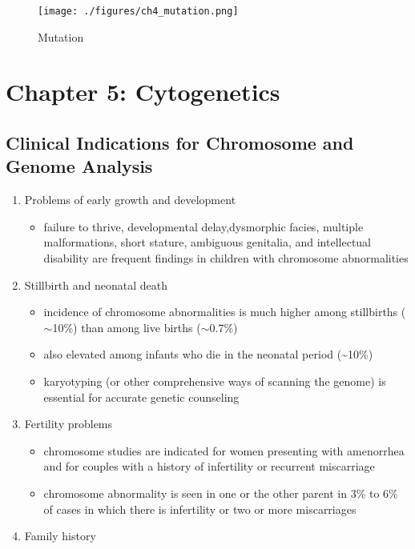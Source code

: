 \documentclass{scrartcl}
\begin{document}
\begin{figure}[htbp]
\centering
\texttt{[image: ./figures/ch4\_mutation.png]}
\caption{\label{fig:org35d6c0f}
Mutation}
\end{figure}

\section{Chapter 5: Cytogenetics}
\label{sec:org348f328}
\subsection{Clinical Indications for Chromosome and Genome Analysis}
\label{sec:org6d50cd8}
\begin{enumerate}
\item Problems of early growth and development
\label{sec:org7985ddf}
\begin{itemize}
\item failure to thrive, developmental delay,dysmorphic facies, multiple
malformations, short stature, ambiguous genitalia, and
intellectual disability are frequent findings in children with
chromosome abnormalities
\end{itemize}
\item Stillbirth and neonatal death
\label{sec:org608cdf9}
\begin{itemize}
\item incidence of chromosome abnormalities is much higher among
stillbirths (\(\sim\)10\%) than among live births (\(\sim\)0.7\%)
\item also elevated among infants who die in the neonatal period (\textasciitilde{}10\%)
\item karyotyping (or other comprehensive ways of scanning the genome) is
essential for accurate genetic counseling
\end{itemize}
\item Fertility problems
\label{sec:org0249dad}
\begin{itemize}
\item chromosome studies are indicated for women presenting with
amenorrhea and for couples with a history of infertility or recurrent miscarriage
\item chromosome abnormality is seen in one or the other parent in 3\% to
6\% of cases in which there is infertility or two or more
miscarriages
\end{itemize}
\item Family history
\label{sec:org8a39e01}
\begin{itemize}

\end{itemize}
\end{enumerate}
\end{document}
